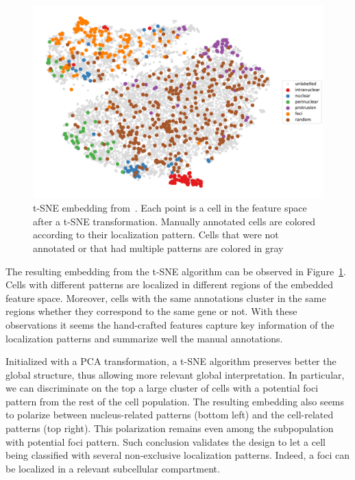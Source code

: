 \begin{figure}[h]
    \centering
    \includegraphics[width=\textwidth]{figures/chapter5/tsne_annotation_legend}
    \caption{t-SNE embedding from~\cite{CHOUAIB_2020}.
	Each point is a cell in the feature space after a t-SNE transformation.
	Manually annotated cells are colored according to their localization pattern.
	Cells that were not annotated or that had multiple patterns are colored in gray}
    \label{fig:tsne_annotation_racha}
\end{figure}

The resulting embedding from the \ac{t-SNE} algorithm can be observed in Figure~\ref{fig:tsne_annotation_racha}.
Cells with different patterns are localized in different regions of the embedded feature space.
Moreover, cells with the same annotations cluster in the same regions whether they correspond to the same gene or not.
With these observations it seems the hand-crafted features capture key information of the localization patterns and summarize well the manual annotations.

Initialized with a PCA transformation, a \ac{t-SNE} algorithm preserves better the global structure, thus allowing more relevant global interpretation.
In particular, we can discriminate on the top a large cluster of cells with a potential foci pattern from the rest of the cell population.
The resulting embedding also seems to polarize between nucleus-related patterns (bottom left) and the cell-related patterns (top right).
This polarization remains even among the subpopulation with potential foci pattern.
Such conclusion validates the design to let a cell being classified with several non-exclusive localization patterns.
Indeed, a foci can be localized in a relevant subcellular compartment.

